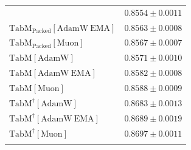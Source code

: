 \begin{longtable}{p{}p{}}
{\begin{tabular}{ll}
{\footnotesize $\mathrm{TabM_{\text{Packed}}[AdamW]}$ } & {\footnotesize$0.8554 \pm 0.0011$}\\ 
{\footnotesize $\mathrm{TabM_{\text{Packed}}[AdamW\ EMA]}$ } & {\footnotesize$0.8563 \pm 0.0008$}\\ 
{\footnotesize $\mathrm{TabM_{\text{Packed}}[Muon]}$ } & {\footnotesize$0.8567 \pm 0.0007$}\\ 
{\footnotesize $\mathrm{TabM[AdamW]}$ } & {\footnotesize$0.8571 \pm 0.0010$}\\ 
{\footnotesize $\mathrm{TabM[AdamW\ EMA]}$ } & {\footnotesize$0.8582 \pm 0.0008$}\\ 
{\footnotesize $\mathrm{TabM[Muon]}$ } & {\footnotesize$0.8588 \pm 0.0009$}\\ 
{\footnotesize $\mathrm{TabM^\dagger[AdamW]}$ } & {\footnotesize$0.8683 \pm 0.0013$}\\ 
{\footnotesize $\mathrm{TabM^\dagger[AdamW\ EMA]}$ } & {\footnotesize$0.8689 \pm 0.0019$}\\ 
{\footnotesize $\mathrm{TabM^\dagger[Muon]}$ } & {\footnotesize$0.8697 \pm 0.0011$}\\ 
\bottomrule
\end{tabular}}

&

\topalign{
\centering
\setlength\tabcolsep{2.5pt}
\renewcommand{\arraystretch}{0.8}
\begin{tabular}{ll}


\end{tabular}}
\end{longtable}
